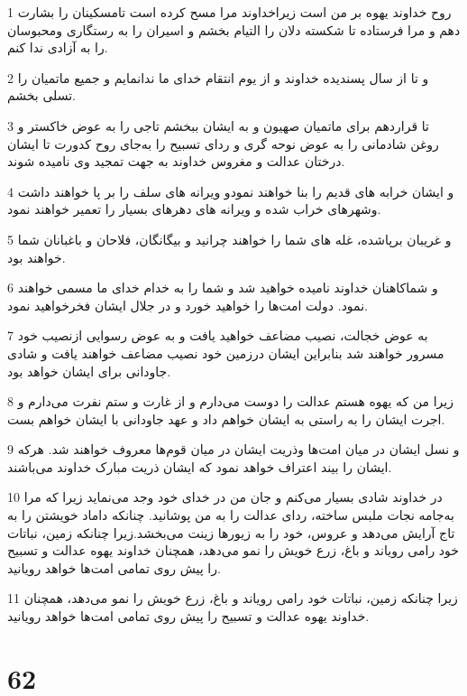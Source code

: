 \par 1 روح خداوند یهوه بر من است زیراخداوند مرا مسح کرده است تامسکینان را بشارت دهم و مرا فرستاده تا شکسته دلان را التیام بخشم و اسیران را به رستگاری ومحبوسان را به آزادی ندا کنم.
\par 2 و تا از سال پسندیده خداوند و از یوم انتقام خدای ما ندانمایم و جمیع ماتمیان را تسلی بخشم.
\par 3 تا قراردهم برای ماتمیان صهیون و به ایشان ببخشم تاجی را به عوض خاکستر و روغن شادمانی را به عوض نوحه گری و ردای تسبیح را به‌جای روح کدورت تا ایشان درختان عدالت و مغروس خداوند به جهت تمجید وی نامیده شوند.
\par 4 و ایشان خرابه های قدیم را بنا خواهند نمودو ویرانه های سلف را بر پا خواهند داشت وشهرهای خراب شده و ویرانه های دهرهای بسیار را تعمیر خواهند نمود.
\par 5 و غریبان برپاشده، غله های شما را خواهند چرانید و بیگانگان، فلاحان و باغبانان شما خواهند بود.
\par 6 و شماکاهنان خداوند نامیده خواهید شد و شما را به خدام خدای ما مسمی خواهند نمود. دولت امت‌ها را خواهید خورد و در جلال ایشان فخرخواهید نمود.
\par 7 به عوض خجالت، نصیب مضاعف خواهید یافت و به عوض رسوایی ازنصیب خود مسرور خواهند شد بنابراین ایشان درزمین خود نصیب مضاعف خواهند یافت و شادی جاودانی برای ایشان خواهد بود.
\par 8 زیرا من که یهوه هستم عدالت را دوست می‌دارم و از غارت و ستم نفرت می‌دارم و اجرت ایشان را به راستی به ایشان خواهم داد و عهد جاودانی با ایشان خواهم بست.
\par 9 و نسل ایشان در میان امت‌ها وذریت ایشان در میان قوم‌ها معروف خواهند شد. هر‌که ایشان را بیند اعتراف خواهد نمود که ایشان ذریت مبارک خداوند می‌باشند.
\par 10 در خداوند شادی بسیار می‌کنم و جان من در خدای خود وجد می‌نماید زیرا که مرا به‌جامه نجات ملبس ساخته، ردای عدالت را به من پوشانید. چنانکه داماد خویشتن را به تاج آرایش می‌دهد و عروس، خود را به زیورها زینت می‌بخشد.زیرا چنانکه زمین، نباتات خود رامی رویاند و باغ، زرع خویش را نمو می‌دهد، همچنان خداوند یهوه عدالت و تسبیح را پیش روی تمامی امت‌ها خواهد رویانید.
\par 11 زیرا چنانکه زمین، نباتات خود رامی رویاند و باغ، زرع خویش را نمو می‌دهد، همچنان خداوند یهوه عدالت و تسبیح را پیش روی تمامی امت‌ها خواهد رویانید.
 
\chapter{62}


